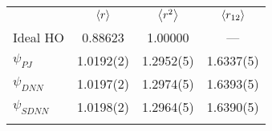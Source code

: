 \begin{tabular}{l*3{S[table-format=3.6]}}
\toprule
\addlinespace
& {$\expval{r}$} & {$\expval{r^2}$} & {$\expval{r_{12}}$} \\
\addlinespace
\midrule
\addlinespace
\addlinespace
Ideal HO    & 0.88623 & 1.00000 & {---}\\
$\psi_{PJ}$ & 1.0192(2) & 1.2952(5) & 1.6337(5)\\
$\psi_{DNN}$  & 1.0197(2) & 1.2974(5) & 1.6393(5)\\
$\psi_{SDNN}$ & 1.0198(2) & 1.2964(5) & 1.6390(5)\\
\addlinespace\addlinespace\bottomrule
\end{tabular}